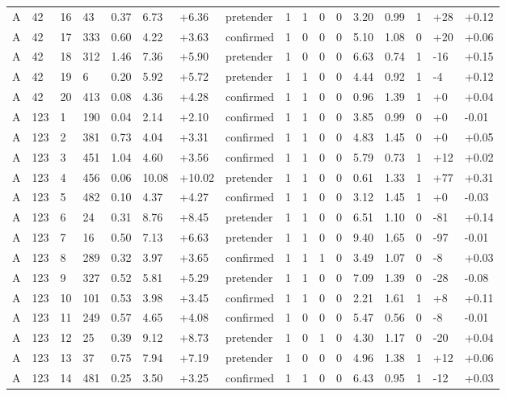 \documentclass[11pt,a4paper]{article}
\begin{document}
{\begin{longtable}[]{@{}lllllllllllllllll@{}}
A & 42 & 16 & 43 & 0.37 & 6.73 & +6.36 & pretender & 1 & 1 & 0 & 0 & 3.20 & 0.99 & 1 & +28 & +0.12 \\
A & 42 & 17 & 333 & 0.60 & 4.22 & +3.63 & confirmed & 1 & 0 & 0 & 0 & 5.10 & 1.08 & 0 & +20 & +0.06 \\
A & 42 & 18 & 312 & 1.46 & 7.36 & +5.90 & pretender & 1 & 0 & 0 & 0 & 6.63 & 0.74 & 1 & -16 & +0.15 \\
A & 42 & 19 & 6 & 0.20 & 5.92 & +5.72 & pretender & 1 & 1 & 0 & 0 & 4.44 & 0.92 & 1 & -4 & +0.12 \\
A & 42 & 20 & 413 & 0.08 & 4.36 & +4.28 & confirmed & 1 & 1 & 0 & 0 & 0.96 & 1.39 & 1 & +0 & +0.04 \\
A & 123 & 1 & 190 & 0.04 & 2.14 & +2.10 & confirmed & 1 & 1 & 0 & 0 & 3.85 & 0.99 & 0 & +0 & -0.01 \\
A & 123 & 2 & 381 & 0.73 & 4.04 & +3.31 & confirmed & 1 & 1 & 0 & 0 & 4.83 & 1.45 & 0 & +0 & +0.05 \\
A & 123 & 3 & 451 & 1.04 & 4.60 & +3.56 & confirmed & 1 & 1 & 0 & 0 & 5.79 & 0.73 & 1 & +12 & +0.02 \\
A & 123 & 4 & 456 & 0.06 & 10.08 & +10.02 & pretender & 1 & 1 & 0 & 0 & 0.61 & 1.33 & 1 & +77 & +0.31 \\
A & 123 & 5 & 482 & 0.10 & 4.37 & +4.27 & confirmed & 1 & 1 & 0 & 0 & 3.12 & 1.45 & 1 & +0 & -0.03 \\
A & 123 & 6 & 24 & 0.31 & 8.76 & +8.45 & pretender & 1 & 1 & 0 & 0 & 6.51 & 1.10 & 0 & -81 & +0.14 \\
A & 123 & 7 & 16 & 0.50 & 7.13 & +6.63 & pretender & 1 & 1 & 0 & 0 & 9.40 & 1.65 & 0 & -97 & -0.01 \\
A & 123 & 8 & 289 & 0.32 & 3.97 & +3.65 & confirmed & 1 & 1 & 1 & 0 & 3.49 & 1.07 & 0 & -8 & +0.03 \\
A & 123 & 9 & 327 & 0.52 & 5.81 & +5.29 & pretender & 1 & 1 & 0 & 0 & 7.09 & 1.39 & 0 & -28 & -0.08 \\
A & 123 & 10 & 101 & 0.53 & 3.98 & +3.45 & confirmed & 1 & 1 & 0 & 0 & 2.21 & 1.61 & 1 & +8 & +0.11 \\
A & 123 & 11 & 249 & 0.57 & 4.65 & +4.08 & confirmed & 1 & 0 & 0 & 0 & 5.47 & 0.56 & 0 & -8 & -0.01 \\
A & 123 & 12 & 25 & 0.39 & 9.12 & +8.73 & pretender & 1 & 0 & 1 & 0 & 4.30 & 1.17 & 0 & -20 & +0.04 \\
A & 123 & 13 & 37 & 0.75 & 7.94 & +7.19 & pretender & 1 & 0 & 0 & 0 & 4.96 & 1.38 & 1 & +12 & +0.06 \\
A & 123 & 14 & 481 & 0.25 & 3.50 & +3.25 & confirmed & 1 & 1 & 0 & 0 & 6.43 & 0.95 & 1 & -12 & +0.03 \\

\end{longtable}}
\end{document}

